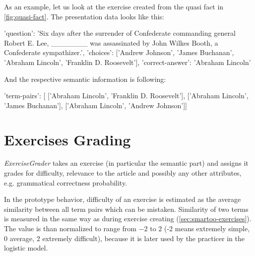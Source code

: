 \documentclass[12pt, twoside]{fithesis2}
\renewcommand{\_}{\leavevmode \kern0.07em\vbox{\hrule width0.4em}}
\newcounter{choice}
\renewcommand\thechoice{\Alph{choice}}
\newcommand\choicelabel{\thechoice.}
\newenvironment{choices}%
  {\vspace{0.8em}\list{\choicelabel}%
     {\usecounter{choice}\def\makelabel##1{\hss\llap{##1}}%
       \settowidth{\leftmargin}{W.\hskip\labelsep\hskip 0.01em}%
       \def\choice{%
         \item
       } %
       \labelwidth\leftmargin\advance\labelwidth-\labelsep
       \topsep=0pt
       \partopsep=0pt
     }%
  }%
  {\vspace{-0.7em}\endlist}
\newenvironment{question}
{
  \begin{center}
  \vspace{-0.5em}
  \begin{tabular}{p{0.9\textwidth}}
}
{
  \\
  \end{tabular}
  \vspace{-1em}
  \end{center}
}
\newcommand{\sentenceGap}{\rule{1.5cm}{0.4pt}~}
\begin{document}
As an example, let us look at the exercise created from the quasi fact in \autoref{fig:quasi-fact}. The presentation data looks like this:
\begin{code}
{'question': 'Six days after the surrender of Confederate commanding
              general Robert E. Lee, _______ was assassinated by
              John Wilkes Booth, a Confederate sympathizer.',
'choices': ['Andrew Johnson', 'James Buchanan',
            'Abraham Lincoln', 'Franklin D. Roosevelt'],
'correct-answer': 'Abraham Lincoln'}
\end{code}



\noindent
And the respective semantic information is following:
\begin{code}
{'term-pairs': [
    ['Abraham Lincoln', 'Franklin D. Roosevelt'],
    ['Abraham Lincoln', 'James Buchanan'],
    ['Abraham Lincoln', 'Andrew Johnson']]}
\end{code}

\section{Exercises Grading}
\label{sec:smartoo-exercises-grading}

\textit{ExerciseGrader} takes an exercise (in particular the semantic part) and assigns it grades for difficulty, relevance to the article and possibly any other attributes, e.g. grammatical correctness probability.

In the prototype behavior, difficulty of an exercise is estimated as the average similarity between all term pairs which can be mistaken.
Similarity of two terms is measured in the same way as during exercise creating (\autoref{sec:smartoo-exercises}).
The value is than normalized to range from $-2$ to $2$
(-2 means extremely simple, 0 average, 2 extremely difficult),
because it is later used by the practicer in the logistic model.
\end{document}
